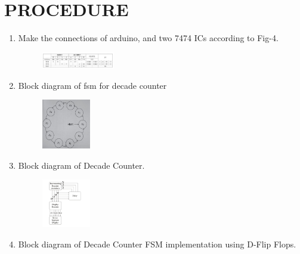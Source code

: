 \documentclass[conference]{IEEEtran}
\begin{document}
\section{PROCEDURE}


\begin{enumerate}

\item Make the connections of arduino, and two 7474 ICs according to Fig-4.
	\begin{figure}[h] 
	\centering 
	\includegraphics[width=0.3\textwidth]{4.jpg     }
	\caption{\label{fig-4:Gates}}    
\end{figure}

\item Block diagram of fsm for decade counter
\begin{figure}[h]                           
\centering                                 
\includegraphics[width=0.2\textwidth]{5.jpg  }                                           
\caption{\label{fig-5:Gates}}               
\end{figure}



\item Block diagram of Decade Counter.

\begin{figure}[h]                           
\centering                                 
\includegraphics[width=0.2\textwidth]{6.jpg}                                           
\caption{\label{fig-5:Gates}}               
\end{figure}





\item Block diagram of Decade Counter FSM implementation using D-Flip Flops.


\end{enumerate}
\end{document}
